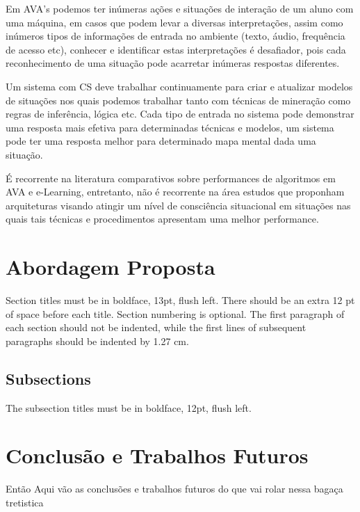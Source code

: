 \documentclass[12pt]{article}
\begin{document}
Em AVA's podemos ter inúmeras ações e situações de interação de um aluno com uma máquina, em casos que podem levar a diversas interpretações, assim como inúmeros tipos de informações de entrada no ambiente (texto, áudio, frequência de acesso etc), conhecer e identificar estas interpretações é desafiador, pois cada reconhecimento de uma situação pode acarretar inúmeras respostas diferentes. 

Um sistema com CS deve trabalhar continuamente para criar e atualizar modelos de situações nos quais podemos trabalhar tanto com técnicas de mineração como regras de inferência, lógica etc. Cada tipo de entrada no sistema pode demonstrar uma resposta mais efetiva para determinadas técnicas e modelos, um sistema pode ter uma resposta melhor para determinado mapa mental dada uma situação. 

É recorrente na literatura comparativos sobre performances de algoritmos em AVA e e-Learning, entretanto, não é recorrente na área estudos que proponham arquiteturas visando atingir um nível de consciência situacional em situações nas quais tais técnicas e procedimentos apresentam uma melhor performance.  






\section{Abordagem Proposta}

Section titles must be in boldface, 13pt, flush left. There should be an extra
12 pt of space before each title. Section numbering is optional. The first
paragraph of each section should not be indented, while the first lines of
subsequent paragraphs should be indented by 1.27 cm.

\subsection{Subsections}

The subsection titles must be in boldface, 12pt, flush left.



\section{Conclusão e Trabalhos Futuros}
Então Aqui vão as conclusões e trabalhos futuros do que vai rolar nessa bagaça tretistica



\end{document}
